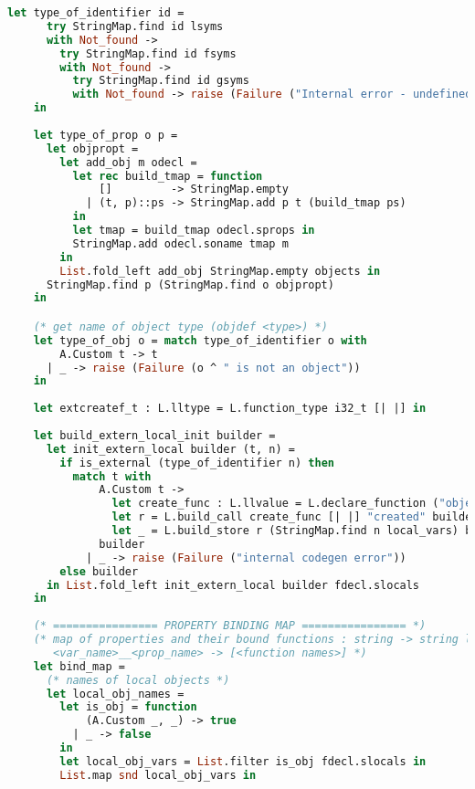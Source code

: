\begin{lstlisting}[language=Caml,backgroundcolor=\color{backgroundcolor}]
    let type_of_identifier id =
      try StringMap.find id lsyms
      with Not_found -> 
        try StringMap.find id fsyms
        with Not_found -> 
          try StringMap.find id gsyms
          with Not_found -> raise (Failure ("Internal error - undefined identifier " ^ id))
    in
    
    let type_of_prop o p = 
      let objpropt = 
        let add_obj m odecl =
          let rec build_tmap = function
              []         -> StringMap.empty
            | (t, p)::ps -> StringMap.add p t (build_tmap ps)
          in
          let tmap = build_tmap odecl.sprops in
          StringMap.add odecl.soname tmap m
        in
        List.fold_left add_obj StringMap.empty objects in
      StringMap.find p (StringMap.find o objpropt)
    in

    (* get name of object type (objdef <type>) *)
    let type_of_obj o = match type_of_identifier o with
        A.Custom t -> t
      | _ -> raise (Failure (o ^ " is not an object"))
    in
    
    let extcreatef_t : L.lltype = L.function_type i32_t [| |] in
    
    let build_extern_local_init builder = 
      let init_extern_local builder (t, n) =
        if is_external (type_of_identifier n) then
          match t with
              A.Custom t ->
                let create_func : L.llvalue = L.declare_function ("object_new_" ^ t) extcreatef_t the_module in
                let r = L.build_call create_func [| |] "created" builder in
                let _ = L.build_store r (StringMap.find n local_vars) builder in
              builder
            | _ -> raise (Failure ("internal codegen error"))
        else builder
      in List.fold_left init_extern_local builder fdecl.slocals
    in
    
    (* ================ PROPERTY BINDING MAP ================ *)
    (* map of properties and their bound functions : string -> string list
       <var_name>__<prop_name> -> [<function names>] *)
    let bind_map = 
      (* names of local objects *)
      let local_obj_names =
        let is_obj = function
            (A.Custom _, _) -> true
          | _ -> false
        in
        let local_obj_vars = List.filter is_obj fdecl.slocals in
        List.map snd local_obj_vars in


\end{lstlisting}
